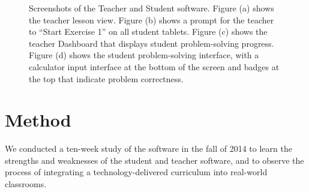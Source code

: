 \documentclass{sigchi}
\begin{document}
\begin{figure}[t]
\caption{
Screenshots of the Teacher and Student software. Figure (a) shows the teacher lesson view. Figure (b) shows a prompt for the teacher to ``Start Exercise 1'' on all student tablets. Figure (c) shows the teacher Dashboard that displays student problem-solving progress. Figure (d) shows the student problem-solving interface, with a calculator input interface at the bottom of the screen and badges at the top that indicate problem correctness. }
\label{fig:Spreadsheet}
\end{figure}

\section{Method}
We conducted a ten-week study of the software in the fall of 2014 to learn the strengths and weaknesses of the student and teacher software, and to observe the process of integrating a technology-delivered curriculum into real-world classrooms.


%
%
%
%
%
%
\end{document}
